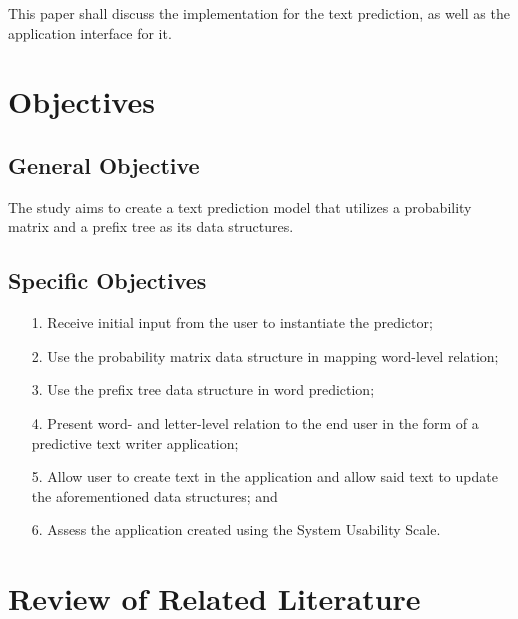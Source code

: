 \documentclass[journal]{./IEEE/IEEEtran}
\begin{document}
This paper shall discuss the implementation for the text prediction, as well as the application interface for it.

\section{Objectives}

\subsection{General Objective}
The study aims to create a text prediction model that utilizes a probability matrix and a prefix tree as its data structures.

\subsection{Specific Objectives}
\begin{enumerate}{}

\item[1.] Receive initial input from the user to instantiate the predictor;

\item[2.] Use the probability matrix data structure in mapping word-level relation;

\item[3.] Use the prefix tree data structure in word prediction;

\item[4.] Present word- and letter-level relation to the end user in the form of a predictive text writer application;

\item[5.] Allow user to create text in the application and allow said text to update the aforementioned data structures; and

\item[6.] Assess the application created using the System Usability Scale.

\end{enumerate}

\section{Review of Related Literature}

\end{document}
